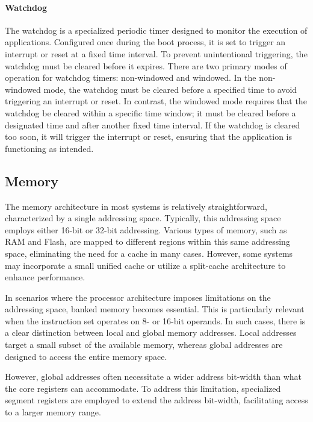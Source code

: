 \paragraph*{Watchdog}
The watchdog is a specialized periodic timer designed to monitor the execution of applications. 
Configured once during the boot process, it is set to trigger an interrupt or reset at a fixed time interval. 
To prevent unintentional triggering, the watchdog must be cleared before it expires.
There are two primary modes of operation for watchdog timers: non-windowed and windowed. 
In the non-windowed mode, the watchdog must be cleared before a specified time to avoid triggering an interrupt or reset. 
In contrast, the windowed mode requires that the watchdog be cleared within a specific time window; it must be cleared before a designated time and after another fixed time interval. 
If the watchdog is cleared too soon, it will trigger the interrupt or reset, ensuring that the application is functioning as intended.

\subsection{Memory}
The memory architecture in most systems is relatively straightforward, characterized by a single addressing space. 
Typically, this addressing space employs either 16-bit or 32-bit addressing. 
Various types of memory, such as RAM and Flash, are mapped to different regions within this same addressing space, eliminating the need for a cache in many cases. 
However, some systems may incorporate a small unified cache or utilize a split-cache architecture to enhance performance.

In scenarios where the processor architecture imposes limitations on the addressing space, banked memory becomes essential. 
This is particularly relevant when the instruction set operates on 8- or 16-bit operands. In such cases, there is a clear distinction between local and global memory addresses.
Local addresses target a small subset of the available memory, whereas global addresses are designed to access the entire memory space.

However, global addresses often necessitate a wider address bit-width than what the core registers can accommodate. 
To address this limitation, specialized segment registers are employed to extend the address bit-width, facilitating access to a larger memory range.

